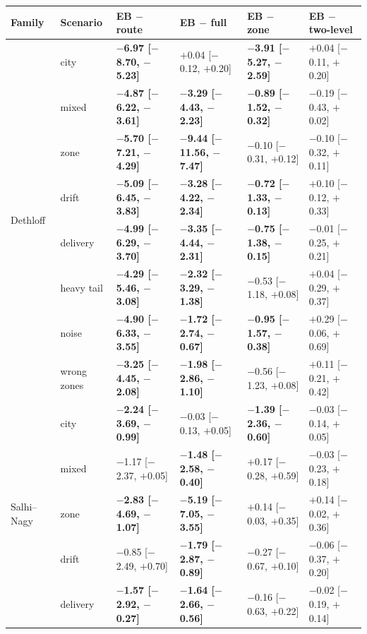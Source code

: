 \begin{tabular}{llllll}
\toprule
Family & Scenario & EB $-$ route & EB $-$ full & EB $-$ zone & EB $-$ two-level \\
\midrule
\multirow{8}{*}{Dethloff} & city & \textbf{$-$6.97 [$-$8.70, $-$5.23]} & $+$0.04 [$-$0.12, $+$0.20] & \textbf{$-$3.91 [$-$5.27, $-$2.59]} & $+$0.04 [$-$0.11, $+$0.20] \\
 & mixed & \textbf{$-$4.87 [$-$6.22, $-$3.61]} & \textbf{$-$3.29 [$-$4.43, $-$2.23]} & \textbf{$-$0.89 [$-$1.52, $-$0.32]} & $-$0.19 [$-$0.43, $+$0.02] \\
 & zone & \textbf{$-$5.70 [$-$7.21, $-$4.29]} & \textbf{$-$9.44 [$-$11.56, $-$7.47]} & $-$0.10 [$-$0.31, $+$0.12] & $-$0.10 [$-$0.32, $+$0.11] \\
 & drift & \textbf{$-$5.09 [$-$6.45, $-$3.83]} & \textbf{$-$3.28 [$-$4.22, $-$2.34]} & \textbf{$-$0.72 [$-$1.33, $-$0.13]} & $+$0.10 [$-$0.12, $+$0.33] \\
 & delivery & \textbf{$-$4.99 [$-$6.29, $-$3.70]} & \textbf{$-$3.35 [$-$4.44, $-$2.31]} & \textbf{$-$0.75 [$-$1.38, $-$0.15]} & $-$0.01 [$-$0.25, $+$0.21] \\
 & heavy tail & \textbf{$-$4.29 [$-$5.46, $-$3.08]} & \textbf{$-$2.32 [$-$3.29, $-$1.38]} & $-$0.53 [$-$1.18, $+$0.08] & $+$0.04 [$-$0.29, $+$0.37] \\
 & noise & \textbf{$-$4.90 [$-$6.33, $-$3.55]} & \textbf{$-$1.72 [$-$2.74, $-$0.67]} & \textbf{$-$0.95 [$-$1.57, $-$0.38]} & $+$0.29 [$-$0.06, $+$0.69] \\
 & wrong zones & \textbf{$-$3.25 [$-$4.45, $-$2.08]} & \textbf{$-$1.98 [$-$2.86, $-$1.10]} & $-$0.56 [$-$1.23, $+$0.08] & $+$0.11 [$-$0.21, $+$0.42] \\
\midrule
\multirow{8}{*}{Salhi--Nagy} & city & \textbf{$-$2.24 [$-$3.69, $-$0.99]} & $-$0.03 [$-$0.13, $+$0.05] & \textbf{$-$1.39 [$-$2.36, $-$0.60]} & $-$0.03 [$-$0.14, $+$0.05] \\
 & mixed & $-$1.17 [$-$2.37, $+$0.05] & \textbf{$-$1.48 [$-$2.58, $-$0.40]} & $+$0.17 [$-$0.28, $+$0.59] & $-$0.03 [$-$0.23, $+$0.18] \\
 & zone & \textbf{$-$2.83 [$-$4.69, $-$1.07]} & \textbf{$-$5.19 [$-$7.05, $-$3.55]} & $+$0.14 [$-$0.03, $+$0.35] & $+$0.14 [$-$0.02, $+$0.36] \\
 & drift & $-$0.85 [$-$2.49, $+$0.70] & \textbf{$-$1.79 [$-$2.87, $-$0.89]} & $-$0.27 [$-$0.67, $+$0.10] & $-$0.06 [$-$0.37, $+$0.20] \\
 & delivery & \textbf{$-$1.57 [$-$2.92, $-$0.27]} & \textbf{$-$1.64 [$-$2.66, $-$0.56]} & $-$0.16 [$-$0.63, $+$0.22] & $-$0.02 [$-$0.19, $+$0.14] \\

\end{tabular}
